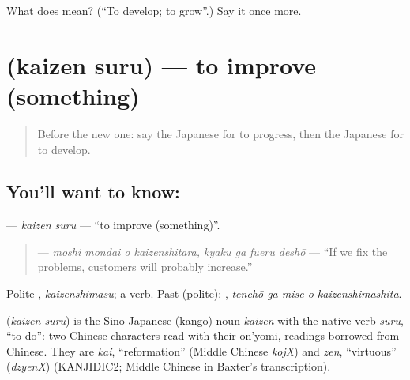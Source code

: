 \begin{tcolorbox}[breakable,colback=teal!4,colframe=teal!35!black,title={Before you move on}]
What does  mean? (\textquotedblleft{}To develop; to grow\textquotedblright{}.) Say it once more.
\end{tcolorbox}
\section[\texorpdfstring{\ja{かいぜんする} (kaizen suru)}{かいぜんする (kaizen suru)}]{ (kaizen suru) — to improve (something)}

\label{lesson:JA-C526-kaizen-suru}



\begin{quote}
Before the new one: say the Japanese for to progress, then the Japanese for to develop.
\end{quote}

\subsection*{You'll want to know: }
\textbf{} — \emph{kaizen suru} — \textquotedblleft{}to improve (something)\textquotedblright{}.

\begin{quote}
\textbf{   } — \emph{moshi mondai o kaizenshitara, kyaku ga fueru deshō} — \textquotedblleft{}If we fix the problems, customers will probably increase.\textquotedblright{}
\end{quote}

Polite \textbf{}, \emph{kaizenshimasu}; a  verb. Past (polite): \textbf{  }, \emph{tenchō ga mise o kaizenshimashita}.

\begin{cousinweb}
\textbf{} (\emph{kaizen suru}) is the Sino-Japanese (kango) noun \emph{kaizen} with the native verb \emph{suru}, \textquotedblleft{}to do\textquotedblright{}: two Chinese characters read with their on'yomi, readings borrowed from Chinese. They are \emph{kai}, \textquotedblleft{}reformation\textquotedblright{} (Middle Chinese \emph{kojX}) and \emph{zen}, \textquotedblleft{}virtuous\textquotedblright{} (\emph{dzyenX}) (KANJIDIC2; Middle Chinese in Baxter's transcription).
\end{cousinweb}

